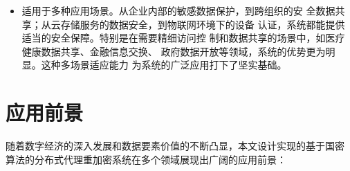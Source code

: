 \begin{enumerate}
\begin{itemize}
		      \item 适用于多种应用场景。从企业内部的敏感数据保护，到跨组织的安
		            全数据共享；从云存储服务的数据安全，到物联网环境下的设备
		            认证，系统都能提供适当的安全保障。特别是在需要精细访问控
		            制和数据共享的场景中，如医疗健康数据共享、金融信息交换、
		            政府数据开放等领域，系统的优势更为明显。这种多场景适应能力
		            为系统的广泛应用打下了坚实基础。
	      \end{itemize}
\end{enumerate}

\section{应用前景}

随着数字经济的深入发展和数据要素价值的不断凸显，本文设计实现的基于国密
算法的分布式代理重加密系统在多个领域展现出广阔的应用前景：

